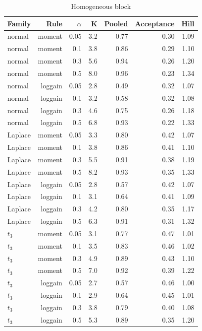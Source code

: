 \begin{table}[htbp]
\centering
\caption{Homogeneous block}
\label{tab:a8_homogeneous}
\small
\begin{tabular}{lrrrrrr}
\toprule
Family & Rule & $\alpha$ & K & Pooled & Acceptance & Hill \\
\midrule
normal & moment & 0.05 & 3.2 & 0.77 & 0.30 & 1.09 \\
normal & moment & 0.1 & 3.8 & 0.86 & 0.29 & 1.10 \\
normal & moment & 0.3 & 5.6 & 0.94 & 0.26 & 1.20 \\
normal & moment & 0.5 & 8.0 & 0.96 & 0.23 & 1.34 \\
normal & loggain & 0.05 & 2.8 & 0.49 & 0.32 & 1.07 \\
normal & loggain & 0.1 & 3.2 & 0.58 & 0.32 & 1.08 \\
normal & loggain & 0.3 & 4.6 & 0.75 & 0.26 & 1.18 \\
normal & loggain & 0.5 & 6.8 & 0.93 & 0.22 & 1.33 \\
Laplace & moment & 0.05 & 3.3 & 0.80 & 0.42 & 1.07 \\
Laplace & moment & 0.1 & 3.8 & 0.86 & 0.41 & 1.10 \\
Laplace & moment & 0.3 & 5.5 & 0.91 & 0.38 & 1.19 \\
Laplace & moment & 0.5 & 8.2 & 0.93 & 0.35 & 1.33 \\
Laplace & loggain & 0.05 & 2.8 & 0.57 & 0.42 & 1.07 \\
Laplace & loggain & 0.1 & 3.1 & 0.64 & 0.41 & 1.09 \\
Laplace & loggain & 0.3 & 4.2 & 0.80 & 0.35 & 1.17 \\
Laplace & loggain & 0.5 & 6.3 & 0.91 & 0.31 & 1.32 \\
$t_3$ & moment & 0.05 & 3.1 & 0.77 & 0.47 & 1.01 \\
$t_3$ & moment & 0.1 & 3.5 & 0.83 & 0.46 & 1.02 \\
$t_3$ & moment & 0.3 & 4.9 & 0.89 & 0.43 & 1.10 \\
$t_3$ & moment & 0.5 & 7.0 & 0.92 & 0.39 & 1.22 \\
$t_3$ & loggain & 0.05 & 2.7 & 0.57 & 0.46 & 1.00 \\
$t_3$ & loggain & 0.1 & 2.9 & 0.64 & 0.45 & 1.01 \\
$t_3$ & loggain & 0.3 & 3.8 & 0.79 & 0.40 & 1.08 \\
$t_3$ & loggain & 0.5 & 5.3 & 0.89 & 0.35 & 1.20 \\
\bottomrule
\end{tabular}
\end{table}
